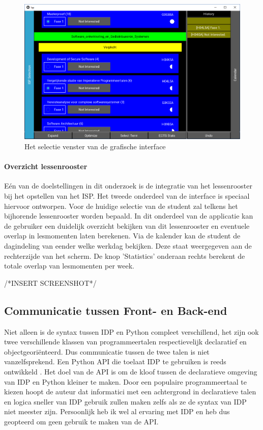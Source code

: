 \begin{figure}
\caption{Het selectie venster van de grafische interface\label{fig:sc1}}
\centering
\includegraphics[scale=.5]{sc1.png}
\end{figure}

\paragraph{Overzicht lessenrooster} 
E\'{e}n van de doelstellingen in dit onderzoek is de integratie van het lessenrooster bij het opstellen van het ISP. Het tweede onderdeel van de interface is speciaal hiervoor ontworpen. Voor de huidige selectie van de student zal telkens het bijhorende lessenrooster worden bepaald. In dit onderdeel van de applicatie kan de gebruiker een duidelijk overzicht bekijken van dit lessenrooster en eventuele overlap in lesmomenten laten berekenen. Via de kalender kan de student de dagindeling van eender welke werkdag bekijken. Deze staat weergegeven aan de rechterzijde van het scherm. De knop 'Statistics' onderaan rechts berekent de totale overlap van lesmomenten per week.

/*INSERT SCREENSHOT*/


\subsection{Communicatie tussen Front- en Back-end}
Niet alleen is de syntax tussen IDP en Python compleet verschillend, het zijn ook twee verschillende klassen van programmeertalen respectievelijk declaratief en objectgeori\"{e}nteerd. Dus communicatie tussen de twee talen is niet vanzelfsprekend. Een Python API die toelaat IDP te gebruiken is reeds ontwikkeld \citep{vennekens2015lowering}. Het doel van de API is om de kloof tussen de declaratieve omgeving van IDP en Python kleiner te maken. Door een populaire programmeertaal te kiezen hoopt de auteur dat informatici met een achtergrond in declaratieve talen en logica sneller van IDP gebruik zullen maken zelfs als ze de syntax van IDP niet meester zijn. Persoonlijk heb ik wel al ervaring met IDP en heb dus geopteerd om geen gebruik te maken van de API. 

